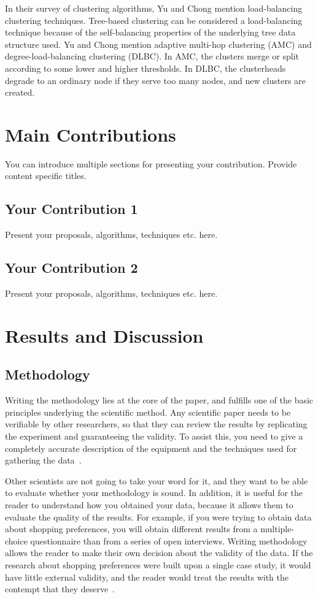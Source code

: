 \documentclass{winslabreport}
\begin{document}
In their survey of clustering algorithms, Yu and Chong \cite{Yu2005} mention
load-balancing clustering techniques. Tree-based clustering can be considered a
load-balancing technique because of the self-balancing properties of the
underlying tree data structure used. Yu and Chong mention adaptive multi-hop
clustering (AMC) and degree-load-balancing clustering (DLBC). In AMC, the
clusters merge or split according to some lower and higher thresholds. In DLBC,
the clusterheads degrade to an ordinary node if they serve too many nodes, and
new clusters are created.

\section{Main Contributions}

You can introduce multiple sections for presenting your contribution. Provide content specific titles.

\subsection{Your Contribution 1}

Present your proposals, algorithms, techniques etc. here.

\subsection{Your Contribution 2}

Present your proposals, algorithms, techniques etc. here.


\section{Results and Discussion}

\subsection{Methodology}
Writing the methodology lies at the core of the paper, and fulfills one of the basic principles underlying the scientific method. Any scientific paper needs to be verifiable by other researchers, so that they can review the results by replicating the experiment and guaranteeing the validity. To assist this, you need to give a completely accurate description of the equipment and the techniques used for gathering the data~\cite{Shuttleworth2016}.

Other scientists are not going to take your word for it, and they want to be able to evaluate whether your methodology is sound. In addition, it is useful for the reader to understand how you obtained your data, because it allows them to evaluate the quality of the results. For example, if you were trying to obtain data about shopping preferences, you will obtain different results from a multiple-choice questionnaire than from a series of open interviews. Writing methodology allows the reader to make their own decision about the validity of the data. If the research about shopping preferences were built upon a single case study, it would have little external validity, and the reader would treat the results with the contempt that they deserve~\cite{Shuttleworth2016}.
\end{document}
